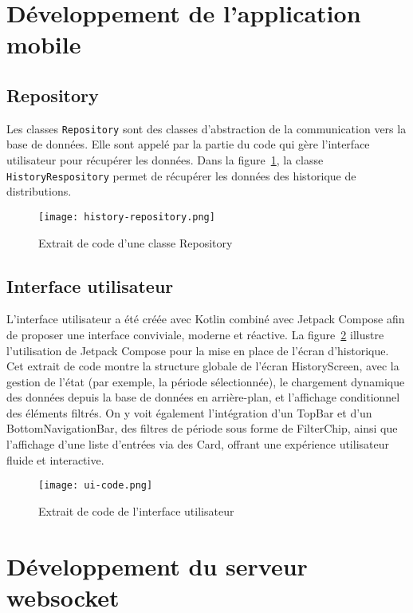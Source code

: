 \section{Développement de l'application mobile}
	\subsection{Repository}
		Les classes \verb|Repository| sont des classes d'abstraction de la communication vers la base de données. Elle sont appelé par la partie du code qui gère l'interface utilisateur pour récupérer les données. 	Dans la figure~\ref{fig:history-repository}, la classe \verb|HistoryRespository| permet de récupérer les données des historique de distributions. 
	\begin{figure}[H]
   			\centering
   			\texttt{[image: history-repository.png]}
   			\caption{Extrait de code d'une classe Repository}
   			\label{fig:history-repository}
	\end{figure}
	
\subsection{Interface utilisateur}
	L’interface utilisateur a été créée avec Kotlin combiné avec Jetpack Compose afin de proposer une interface conviviale, moderne et réactive.
La figure~\ref{fig:ui-code} illustre l’utilisation de Jetpack Compose pour la mise en place de l’écran d’historique. Cet extrait de code montre la structure globale de l’écran HistoryScreen, avec la gestion de l’état (par exemple, la période sélectionnée), le chargement dynamique des données depuis la base de données en arrière-plan, et l’affichage conditionnel des éléments filtrés.
On y voit également l’intégration d’un TopBar et d’un BottomNavigationBar, des filtres de période sous forme de FilterChip, ainsi que l’affichage d’une liste d’entrées via des Card, offrant une expérience utilisateur fluide et interactive.
	
	\begin{figure}[H]
   			\centering
   			\texttt{[image: ui-code.png]}
   			\caption{Extrait de code de l'interface utilisateur}
   			\label{fig:ui-code}
	\end{figure}
	
\section{Développement du serveur websocket}
